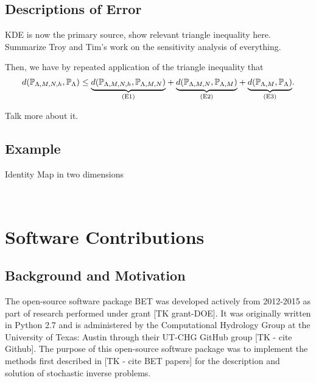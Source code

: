 \vspace{2in}

\subsection{Descriptions of Error}\label{sec:sample-error}

KDE is now the primary source, show relevant triangle inequality here.
Summarize Troy and Tim's work on the sensitivity analysis of everything.


Then, we have by repeated application of the triangle inequality that
\begin{equation}
\label{eq:sample-triangleineq}
d(\mathbb{P}_{{\Lambda}, M, N, h}, \operatorname*{\mathbb{P}_{{\Lambda}}}) \leq
\underset{ \text{(E1)} }{\underbrace{d(\mathbb{P}_{{\Lambda}, M, N, h},\mathbb{P}_{{\Lambda}, M, N})}} +
\underset{ \text{(E2)} }{\underbrace{d(\mathbb{P}_{{\Lambda}, M, N}, \mathbb{P}_{{\Lambda}, M}) }}+
\underset{ \text{(E3)} }{\underbrace{d(\mathbb{P}_{{\Lambda}, M}, \operatorname*{\mathbb{P}_{{\Lambda}}}) }}.
\end{equation}

Talk more about it.

\vspace{2in}

\subsection{Example}\label{sec:sample-example}
Identity Map in two dimensions




\
\section{Software Contributions}\label{sec:ch02-software}

\subsection{Background and Motivation}
The open-source software package BET was developed actively from 2012-2015 as part of research performed under grant [TK grant-DOE].
It was originally written in Python 2.7 and is administered by the Computational Hydrology Group at the University of Texas: Austin through their UT-CHG GitHub group [TK - cite Github].
The purpose of this open-source software package was to implement the methods first described in [TK - cite BET papers] for the description and solution of stochastic inverse problems.

